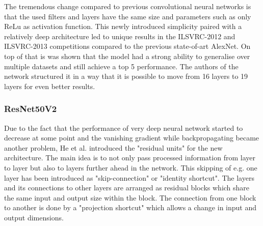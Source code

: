 The tremendous change compared to previous convolutional neural networks is that the used filters and layers have the same size and parameters such as only ReLu as activation function\cite{simonyan2015deep}. This newly introduced simplicity paired with a relatively deep architecture led to unique results in the ILSVRC-2012 and ILSVRC-2013 competitions compared to the previous state-of-art AlexNet. On top of that is was shown that the model had a strong ability to generalise over multiple datasets and still achieve a top 5 performance. The authors of the network structured it in a way that it is possible to move from 16 layers to 19 layers for even better results.

\subsubsection{ResNet50V2}\label{resnet}
Due to the fact that the performance of very deep neural network started to decrease at some point and the vanishing gradient while backpropagating became another problem, He et al. introduced the "residual units" for the new architecture\cite{he2015deep}. The main idea is to not only pass processed information from layer to layer but also to layers further ahead in the network. This skipping of e.g. one layer has been introduced as "skip-connection" or "identity shortcut". The layers and its connections to other layers are arranged as residual blocks which share the same input and output size within the block\cite{he2015deep}. The connection from one block to another is done by a "projection shortcut" which allows a change in input and output dimensions.

